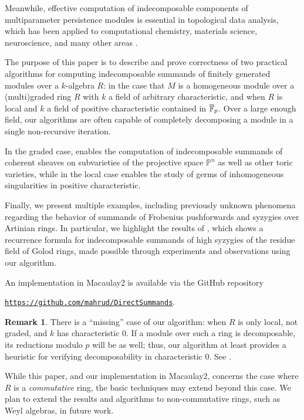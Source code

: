 \documentclass[12pt]{article}
\let\bar\overline
\def\PP{\mathbb P}
\theoremstyle{theorem}
\numberwithin{thm}{section}
\theoremstyle{definition}
\newtheorem{rem}[thm]{Remark}
\begin{document}
Meanwhile, effective computation of indecomposable components of multiparameter persistence modules is essential in topological data analysis, which has been applied to computational chemistry, materials science, neuroscience, and many other areas \cite{BL23}.

The purpose of this paper is to describe and prove correctness of two practical algorithms for computing indecomposable summands of finitely generated modules over a $k$-algebra $R$:  in the case that $M$ is a homogeneous module over a (multi)graded ring $R$ with $k$ a field of arbitrary characteristic, and  when $R$ is local and $k$ a field of positive characteristic contained in $\bar \F_p$. Over a large enough field, our algorithms are often capable of completely decomposing a module in a single non-recursive iteration.

In the graded case,  enables the computation of indecomposable summands of coherent sheaves on subvarieties of the projective space $\PP^n$ as well as other toric varieties, while in the local case  enables the study of germs of inhomogeneous singularities in positive characteristic.

Finally, we present multiple examples, including  previously unknown phenomena regarding the behavior of summands of Frobenius pushforwards and syzygies over Artinian rings. In particular, we highlight the results of \cite{CDE24}, which shows a recurrence formula for indecomposable summands of high syzygies of the residue field of Golod rings, made possible through experiments and observations using our algorithm.

An implementation in Macaulay2 \cite{M2} is available via the GitHub repository \\
\centerline{
  \href{https://github.com/mahrud/DirectSummands}
       {\texttt{https://github.com/mahrud/DirectSummands}}.}


\begin{rem}\label{rem:missing}
  There is a ``missing'' case of our algorithm: when $R$ is only local, not graded, and $k$ has characteristic 0. If a module over such a ring is decomposable, its reductions modulo $p$ will be as well; thus, our algorithm at least provides a heuristic for verifying decomposability in characteristic 0. See .

  While this paper, and our implementation in Macaulay2, concerns the case where $R$ is a \emph{commutative} ring, the basic techniques may extend beyond this case. We plan to extend the results and algorithms to non-commutative rings, such as Weyl algebras, in future work.
\end{rem}
\end{document}

